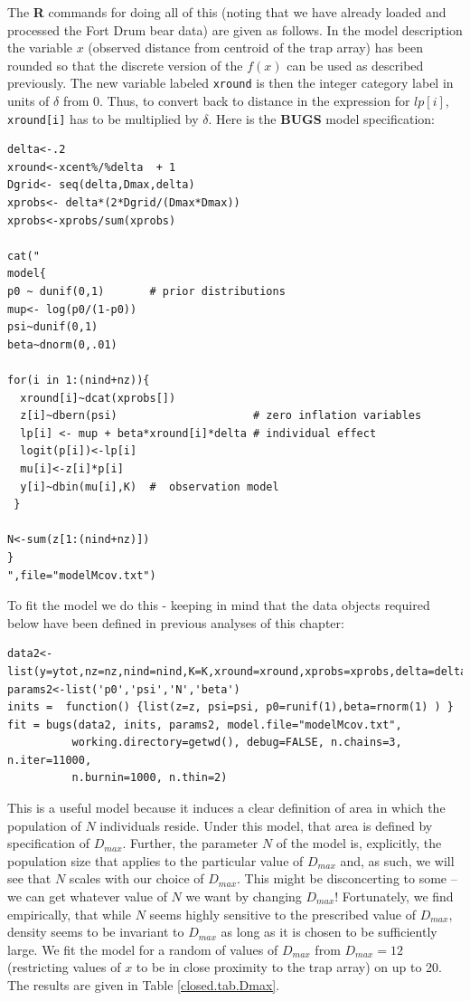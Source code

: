 The {\bf R} commands for doing all of this (noting that we have
already loaded and processed the Fort Drum bear data) are given as
follows. In the model description the variable $x$ (observed distance
from centroid of the trap array) has been rounded so that the discrete
version of the $f(x)$ can be used as described previously. The new
variable labeled \mbox{\tt xround} is then the integer category label
in units of $\delta$ from 0. Thus, to convert back to distance in the
expression for $lp[i]$, \mbox{\tt xround[i]} has to be multiplied by
$\delta$. Here is the {\bf BUGS} model specification:
{\small
\begin{verbatim}
delta<-.2
xround<-xcent%/%delta  + 1
Dgrid<- seq(delta,Dmax,delta)
xprobs<- delta*(2*Dgrid/(Dmax*Dmax))
xprobs<-xprobs/sum(xprobs)

cat("
model{
p0 ~ dunif(0,1)       # prior distributions
mup<- log(p0/(1-p0))
psi~dunif(0,1)
beta~dnorm(0,.01)

for(i in 1:(nind+nz)){
  xround[i]~dcat(xprobs[])
  z[i]~dbern(psi)                     # zero inflation variables
  lp[i] <- mup + beta*xround[i]*delta # individual effect
  logit(p[i])<-lp[i]
  mu[i]<-z[i]*p[i]
  y[i]~dbin(mu[i],K)  #  observation model
 }

N<-sum(z[1:(nind+nz)])
}
",file="modelMcov.txt")
\end{verbatim}
}
To fit the model we do this - keeping in mind that the data objects
required below have been defined in previous analyses of this chapter:
{\small
\begin{verbatim}
data2<-list(y=ytot,nz=nz,nind=nind,K=K,xround=xround,xprobs=xprobs,delta=delta)
params2<-list('p0','psi','N','beta')
inits =  function() {list(z=z, psi=psi, p0=runif(1),beta=rnorm(1) ) }
fit = bugs(data2, inits, params2, model.file="modelMcov.txt",
          working.directory=getwd(), debug=FALSE, n.chains=3, n.iter=11000,
          n.burnin=1000, n.thin=2)
\end{verbatim}
}

This is a useful model because it induces a clear definition of area
in which the population of $N$ individuals reside. Under this model,
that area is defined by specification of $D_{max}$.
Further, the parameter $N$ of the model is, explicitly, the
population size that applies to the particular value of $D_{max}$ and,
as such, we will see that $N$ scales with our choice of $D_{max}$.
This might be disconcerting to some -- we can get whatever value of
$N$ we want by changing $D_{max}$!
Fortunately, we find empirically, that while $N$ seems
highly sensitive to the prescribed value of $D_{max}$, density seems to
be invariant to $D_{max}$ as long as it is chosen to be sufficiently
large. We fit the model for a random of values of $D_{max}$ from $D_{max}=12$ (restricting
values of $x$ to be in close proximity to
the trap array) on up to 20. The results are given in Table
\ref{closed.tab.Dmax}.

